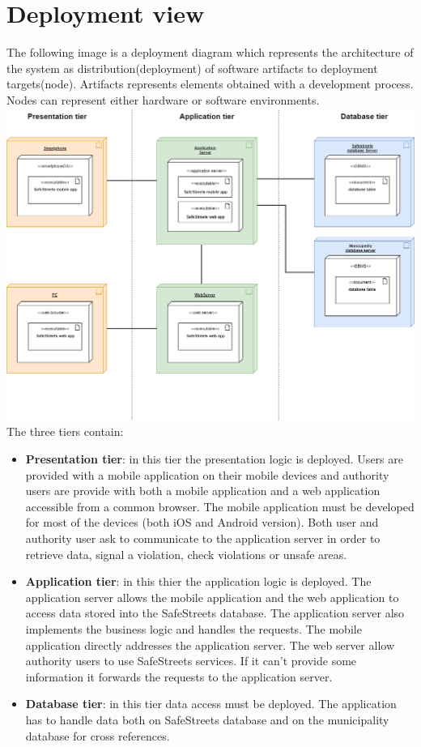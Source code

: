     \section{Deployment view}
    The following image is a deployment diagram which represents the
    architecture of the system as distribution(deployment) of software artifacts
    to deployment targets(node). Artifacts represents elements obtained with a
    development process. Nodes can represent either hardware or software environments.
    \includegraphics[scale=0.4]{dd/resources/images/Deployment Diagram.png}
    The three tiers contain:
    \begin{itemize}
        \item \textbf{Presentation tier}: in this tier the presentation logic is
        deployed. Users are provided with a mobile application on their mobile
        devices and authority users are provide with both a mobile application
        and a web application accessible from a common browser. The mobile
        application must be developed for most of the devices (both iOS and
        Android version). Both user and authority user ask to communicate to the
        application server in order to retrieve data, signal a violation, check
        violations or unsafe areas.
        \item \textbf{Application tier}: in this thier the application logic is
        deployed. The application server allows the mobile application and the
        web application to access data stored into the SafeStreets database. The
        application server also implements the business logic and handles the
        requests. The mobile application directly addresses the application
        server. The web server allow authority users to use SafeStreets
        services. If it can't provide some information it forwards the requests
        to the application server.
        \item \textbf{Database tier}: in this tier data access must be deployed.
        The application has to handle data both on SafeStreets database and on
        the municipality database for cross references.
    \end{itemize}    
